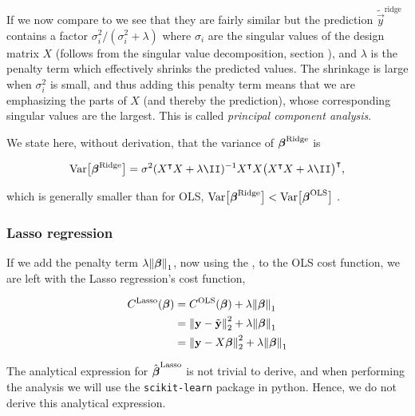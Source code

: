 If we now compare  to  we see that they are fairly similar but the prediction $\tilde{\vec{y}}^{\text{ridge}}$ contains a factor $\sigma_i^2/(\sigma_i^2 + \lambda)$ where $\sigma_i$ are the singular values of the design matrix $X$ (follows from the singular value decomposition, section ), and $\lambda$ is the penalty term which effectively shrinks the predicted values. The shrinkage is large when $\sigma_i^2$ is small, and thus adding this penalty term means that we are emphasizing the parts of $X$ (and thereby the prediction), whose corresponding singular values are the largest. This is called \textit{principal component analysis}.


We state here, without derivation, that the variance of $\boldsymbol{\beta}^\text{Ridge}$ is 

\begin{align*}
    \variance{\svec{\beta}^\text{Ridge}} = \sigma^2 (\hessian + \lambda\II )^{-1} \hessian \big(\hessian + \lambda \II\big)\TT,
\end{align*}

which is generally smaller than for OLS, $\text{Var}\big[\boldsymbol{\beta}^\text{Ridge}\big] <\text{Var}\big[\boldsymbol{\beta}^\text{OLS}\big]$ \citep{mhjensen}.



\subsubsection{Lasso regression}\label{sec:Lasso}

If we add the penalty term $\lambda \norm{\boldsymbol{\beta}}_1$, now using the \footnotemark, to the OLS cost function, we are left with the Lasso regression's cost function,

\begin{align*}
    C^\text{Lasso}(\boldsymbol{\beta})  &= C^\text{OLS}(\boldsymbol{\beta}) + \lambda \norm{\boldsymbol{\beta}}_1 \\
    &= \norm{\mathbf{y}-\tilde{\mathbf{y}}}_2^{2}  + \lambda \norm{\boldsymbol{\beta}}_{1} \\
    &= \norm{\mathbf{y}-X\boldsymbol{\beta}}_2^{2} + \lambda \norm{\boldsymbol{\beta}}_{1}
\end{align*}

The analytical expression for $\hat{\boldsymbol{\beta}}^{\text{Lasso}}$ is not trivial to derive, and when performing the analysis we will use the \texttt{scikit-learn} package in python. Hence, we do not derive this analytical expression. 

